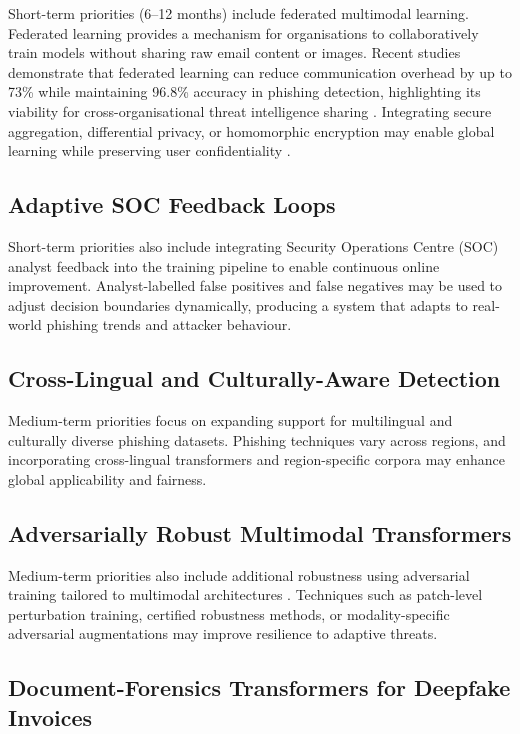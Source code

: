 \documentclass[conference]{IEEEtran}
\begin{document}
Short-term priorities (6--12 months) include federated multimodal learning. Federated learning provides a mechanism for organisations to collaboratively train models without sharing raw email content or images. Recent studies demonstrate that federated learning can reduce communication overhead by up to 73\% while maintaining 96.8\% accuracy in phishing detection, highlighting its viability for cross-organisational threat intelligence sharing \cite{mcmahan_2017_fedavg}. Integrating secure aggregation, differential privacy, or homomorphic encryption may enable global learning while preserving user confidentiality \cite{konecny_2016_federated}.

\subsection{Adaptive SOC Feedback Loops}

Short-term priorities also include integrating Security Operations Centre (SOC) analyst feedback into the training pipeline to enable continuous online improvement. Analyst-labelled false positives and false negatives may be used to adjust decision boundaries dynamically, producing a system that adapts to real-world phishing trends and attacker behaviour.

\subsection{Cross-Lingual and Culturally-Aware Detection}

Medium-term priorities focus on expanding support for multilingual and culturally diverse phishing datasets. Phishing techniques vary across regions, and incorporating cross-lingual transformers and region-specific corpora may enhance global applicability and fairness.

\subsection{Adversarially Robust Multimodal Transformers}

Medium-term priorities also include additional robustness using adversarial training tailored to multimodal architectures \cite{madry_2018_pgd}. Techniques such as patch-level perturbation training, certified robustness methods, or modality-specific adversarial augmentations may improve resilience to adaptive threats.

\subsection{Document-Forensics Transformers for Deepfake Invoices}
\end{document}
